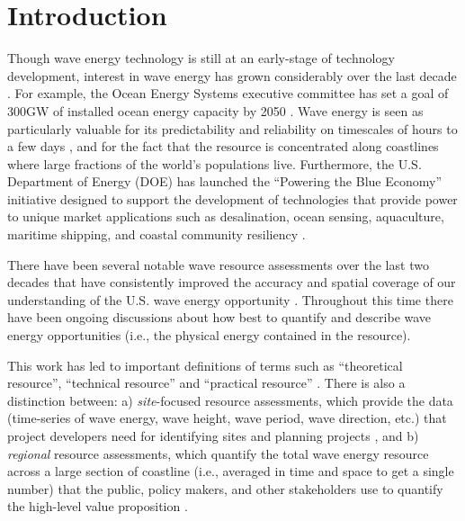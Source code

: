 \section{Introduction}

Though wave energy technology is still at an
early-stage of technology development, interest in wave energy has grown considerably over the last decade
\citep[]{babaritOceanWaveEnergy2017}. For example, the Ocean Energy Systems executive committee has set a goal of 300GW of installed ocean energy capacity by 2050 \citep[]{huckerbyInternationalVisionOcean2017}. Wave energy is seen as particularly
valuable for its predictability and reliability on timescales of hours
to a few days \citep{parkinsonIntegratingOceanWave2015}, and for the
fact that the resource is concentrated along coastlines where large
fractions of the world's populations live. Furthermore, the
U.S. Department of Energy (DOE) has launched the ``Powering the Blue
Economy'' initiative designed to support the development of
technologies that provide power to unique market applications such as
desalination, ocean sensing, aquaculture, maritime shipping, and coastal community
resiliency \citep{livecchiPoweringBlueEconomy2019}. 

There have been several notable wave resource assessments over the last two decades that have consistently improved the accuracy and spatial coverage of our understanding of the U.S. wave energy opportunity \citep[]{EPRIwaveresource2011, bedardOceanWaveEnergy2005, allahdadiDevelopmentValidationRegionalscale2019, garciamedinaWaveResourceCharacterization2021, yangCharacteristicsVariabilityNearshore2020, liWaveEnergyResources2021}.
Throughout this time there have been ongoing discussions about how best to quantify and describe wave energy opportunities (i.e., the physical energy contained in the resource). 

This work has led to important definitions of terms such as ``theoretical resource'', ``technical resource'' and ``practical resource'' \citep[]{internationalelectrotechnicalcommissionPartTerminologyEdition2020}. There is also a distinction between: a) {\em site}-focused resource assessments, which provide the data (time-series of wave energy, wave height, wave period, wave direction, etc.) that project developers need for identifying sites and planning projects \citep[e.g., ][]{internationalelectrotechnicalcommissionPart101Wave2015, robertsonCharacterizingShoreWave2014, kumarWaveEnergyResource2015}, and b) {\em regional} resource assessments, which quantify the total wave energy resource across a large section of coastline (i.e., averaged in time and space to get a single number) that the public, policy makers, and other stakeholders use to quantify the high-level value proposition \citep[e.g., ][]{EPRIwaveresource2011, gunnQuantifyingGlobalWave2012, hemerRevisedAssessmentAustralia2017}.

